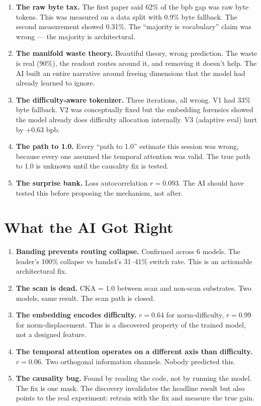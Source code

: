 \documentclass[11pt,a4paper]{report}
\begin{document}
\begin{enumerate}
\item \textbf{The raw byte tax.} The first paper said 62\% of the bpb gap was raw byte tokens. This was measured on a data split with 0.9\% byte fallback. The second measurement showed 0.31\%. The ``majority is vocabulary'' claim was wrong --- the majority is architectural.

\item \textbf{The manifold waste theory.} Beautiful theory, wrong prediction. The waste is real (90\%), the readout routes around it, and removing it doesn't help. The AI built an entire narrative around freeing dimensions that the model had already learned to ignore.

\item \textbf{The difficulty-aware tokenizer.} Three iterations, all wrong. V1 had 33\% byte fallback. V2 was conceptually fixed but the embedding forensics showed the model already does difficulty allocation internally. V3 (adaptive eval) hurt by +0.63 bpb.

\item \textbf{The path to 1.0.} Every ``path to 1.0'' estimate this session was wrong, because every one assumed the temporal attention was valid. The true path to 1.0 is unknown until the causality fix is tested.

\item \textbf{The surprise bank.} Loss autocorrelation $r = 0.093$. The AI should have tested this before proposing the mechanism, not after.
\end{enumerate}

\section{What the AI Got Right}

\begin{enumerate}
\item \textbf{Banding prevents routing collapse.} Confirmed across 6 models. The leader's 100\% collapse vs bands4's 31--41\% switch rate. This is an actionable architectural fix.

\item \textbf{The scan is dead.} CKA = 1.0 between scan and non-scan substrates. Two models, same result. The scan path is closed.

\item \textbf{The embedding encodes difficulty.} $r = 0.64$ for norm-difficulty, $r = 0.99$ for norm-displacement. This is a discovered property of the trained model, not a designed feature.

\item \textbf{The temporal attention operates on a different axis than difficulty.} $r = 0.06$. Two orthogonal information channels. Nobody predicted this.

\item \textbf{The causality bug.} Found by reading the code, not by running the model. The fix is one mask. The discovery invalidates the headline result but also points to the real experiment: retrain with the fix and measure the true gain.
\end{enumerate}
\end{document}
